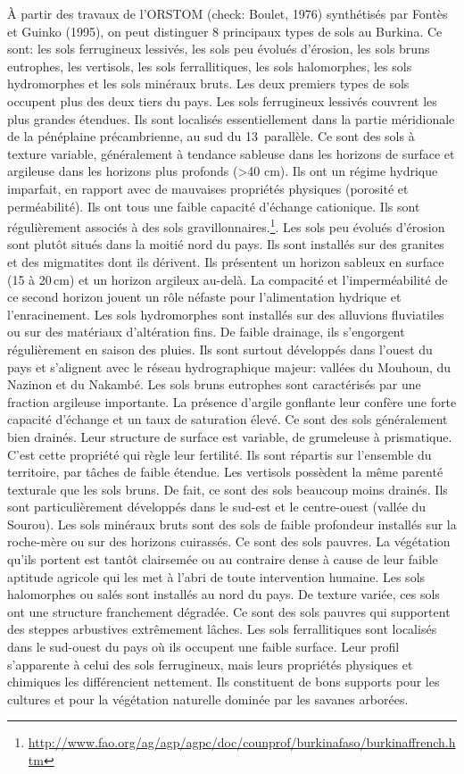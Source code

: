 \documentclass[a4paper,11pt]{article}
\begin{document}
À partir des travaux de l’ORSTOM (check: Boulet, 1976) synthétisés par Fontès
et Guinko (1995), on peut distinguer 8 principaux types de sols au
Burkina. Ce sont: les sols ferrugineux lessivés, les sols peu évolués
d’érosion, les sols bruns eutrophes, les vertisols, les sols
ferrallitiques, les sols halomorphes, les sols hydromorphes et les
sols minéraux bruts. Les deux premiers types de sols occupent plus des
deux tiers du pays.  Les sols ferrugineux lessivés couvrent les plus
grandes étendues. Ils sont localisés essentiellement dans la partie
méridionale de la pénéplaine précambrienne, au sud du 13\ieme\,
parallèle. Ce sont des sols à texture variable, généralement à
tendance sableuse dans les horizons de surface et argileuse dans les
horizons plus profonds (>{}40 cm). Ils ont un régime hydrique imparfait,
en rapport avec de mauvaises propriétés physiques (porosité
et perméabilité). Ils ont tous une faible capacité d’échange
cationique. Ils sont régulièrement associés à des sols
gravillonnaires.\footnote{\url{http://www.fao.org/ag/agp/agpc/doc/counprof/burkinafaso/burkinaffrench.htm}}. Les sols peu évolués d’érosion sont plutôt situés dans la moitié nord du pays. Ils sont
installés sur des granites et des migmatites dont ils dérivent. Ils
présentent un horizon sableux en surface (15 à 20\,cm) et un horizon
argileux au-delà. La compacité et l’imperméabilité de ce second
horizon jouent un rôle néfaste pour l’alimentation hydrique et
l’enracinement.  Les sols hydromorphes sont installés sur des
alluvions fluviatiles ou sur des matériaux d’altération fins. De
faible drainage, ils s’engorgent régulièrement en saison des
pluies. Ils sont surtout développés dans l’ouest du pays et s’alignent
avec le réseau hydrographique majeur: vallées du Mouhoun, du Nazinon
et du Nakambé.  Les sols bruns eutrophes sont caractérisés par une
fraction argileuse importante. La présence d’argile gonflante leur
confère une forte capacité d’échange et un taux de saturation
élevé. Ce sont des sols généralement bien drainés. Leur structure de
surface est variable, de grumeleuse à prismatique. C’est cette
propriété qui règle leur fertilité. Ils sont répartis sur l’ensemble
du territoire, par tâches de faible étendue.  Les vertisols possèdent
la même parenté texturale que les sols bruns.  De fait, ce sont des sols beaucoup
moins drainés. Ils sont particulièrement développés dans le sud-est et
le centre-ouest (vallée du Sourou).  Les sols minéraux bruts sont des
sols de faible profondeur installés sur la roche-mère ou sur des
horizons cuirassés. Ce sont des sols pauvres. La végétation qu’ils
portent est tantôt clairsemée ou au contraire dense à cause de leur
faible aptitude agricole qui les met à l’abri de toute intervention
humaine.  Les sols halomorphes ou salés sont installés au nord du
pays. De texture variée, ces sols ont une structure franchement
dégradée. Ce sont des sols pauvres qui supportent des steppes
arbustives extrêmement lâches.  Les sols ferrallitiques sont localisés
dans le sud-ouest du pays où ils occupent une faible surface. Leur
profil s’apparente à celui des sols ferrugineux, mais leurs propriétés
physiques et chimiques les différencient nettement. Ils constituent de
bons supports pour les cultures et pour la végétation naturelle
dominée par les savanes arborées.
\end{document}
